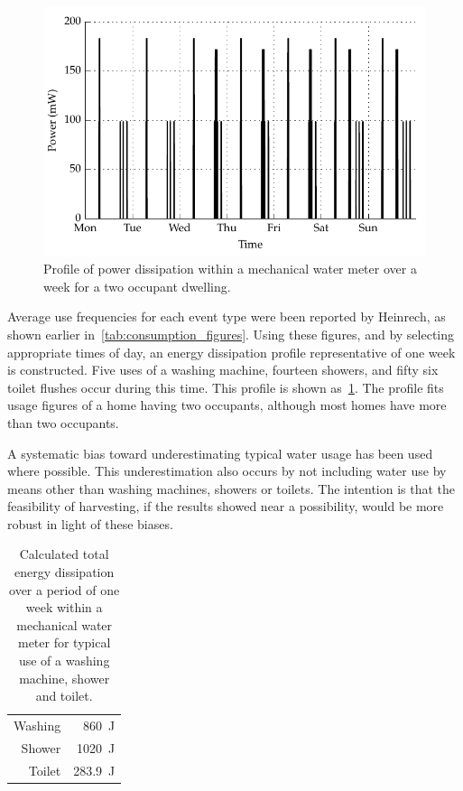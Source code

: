     \begin{figure}
        \centering
        \includegraphics[width=\linewidth]{content/pt1/02-WirelessWaterMeter/graphics/graph_profileEnergy}
        \caption{
          \label{fig:profile_powerDissipation}
          Profile of power dissipation within a mechanical water meter over a week for a two occupant dwelling.
        }
    \end{figure}

    Average use frequencies for each event type were been reported by Heinrech, as shown earlier in~\cref{tab:consumption_figures}.
    Using these figures, and by selecting appropriate times of day, an energy dissipation profile representative of one week is constructed.
    Five uses of a washing machine, fourteen showers, and fifty six toilet flushes occur during this time.
    This profile is shown as~\cref{fig:profile_powerDissipation}.
    The profile fits usage figures of a home having two occupants, although most homes have more than two occupants.

    A systematic bias toward underestimating typical water usage has been used where possible.
    This underestimation also occurs by not including water use by means other than washing machines, showers or toilets.
    The intention is that the feasibility of harvesting, if the results showed near a possibility, would be more robust in light of these biases.

    \begin{table}
      \centering
      \begin{tabular}{r|r}
          Washing & \SI{860}{\joule}\\
          Shower  & \SI{1020}{\joule}\\
          Toilet  & \SI{283.9}{\joule}
      \end{tabular}
      \caption{
          \label{tab:energy_dissipation_total_figures}
          Calculated total energy dissipation over a period of one week within a mechanical water meter for typical use of a washing machine, shower and toilet.
      }
    \end{table}

